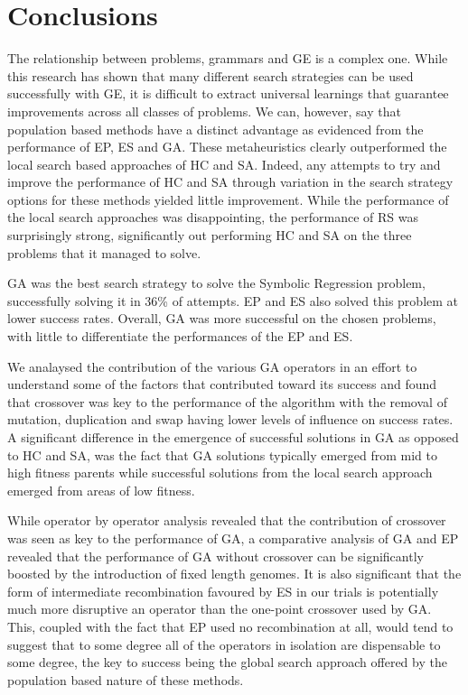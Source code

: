 \section{Conclusions}
The relationship between problems, grammars and GE is a complex one. While this research has shown that many different search strategies can be used successfully with GE, it is difficult to extract universal learnings that guarantee improvements across all classes of problems. We can, however, say that population based methods have a distinct advantage as evidenced from the performance of EP, ES and GA. These metaheuristics clearly outperformed the local search based approaches of HC and SA. Indeed, any attempts to try and improve the performance of HC and SA through variation in the search strategy options for these methods yielded little improvement.
While the performance of the local search approaches was disappointing, the performance of RS was surprisingly strong, significantly out performing HC and SA on the three problems that it managed to solve.  

GA was the best search strategy to solve the Symbolic Regression problem, successfully solving it in 36\% of attempts. EP and ES also solved this problem at lower success rates. Overall, GA was more successful on the chosen problems, with little to differentiate the performances of the EP and ES.

We analaysed the contribution of the various GA operators in an effort to understand some of the factors that contributed toward its success and found that crossover was key to the performance of the algorithm with the removal of mutation, duplication and swap having lower levels of influence on success rates. A significant difference in the emergence of successful solutions in GA as opposed to HC and SA, was the fact that GA solutions typically emerged from mid to high fitness parents while successful solutions from the local search approach emerged from areas of low fitness. 

While operator by operator analysis revealed that the contribution of crossover was seen as key to the performance of GA, a comparative analysis of GA and EP revealed that the performance of GA without crossover can be significantly boosted by the introduction of fixed length genomes. It is also significant that the form of intermediate recombination favoured by ES in our trials is potentially much more disruptive an operator than the one-point crossover used by GA. This, coupled with the fact that EP used no recombination at all, would tend to suggest that to some degree all of the operators in isolation are dispensable to some degree, the key to success being the global search approach offered by the population based nature of these methods. 

